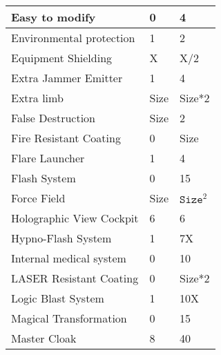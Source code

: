 \documentclass[twoside]{book}
\begin{document}
\begin{longtable}{p{1.25in}ll}
  \raggedright
           Easy to modify 
  &
   0 
  &
   4 
  \tabularnewline
  \hline
      
  \raggedright
           Environmental protection
           
  &
   1 
  &
   2 
  \tabularnewline
  \hline
      
  \raggedright
           Equipment Shielding 
  &
   X 
  &
   X/2 
  \tabularnewline
  \hline
      
  \raggedright
           Extra Jammer Emitter 
  &
   1 
  &
   4 
  \tabularnewline
  \hline
      
  \raggedright
           Extra limb 
  &
   Size 
  &
   Size*2 
  \tabularnewline
  \hline
      
  \raggedright
           False Destruction 
  &
   Size 
  &
   2 
  \tabularnewline
  \hline
      
  \raggedright
           Fire Resistant Coating 
  &
   0 
  &
   Size 
  \tabularnewline
  \hline
      
  \raggedright
           Flare Launcher 
  &
   1 
  &
   4 
  \tabularnewline
  \hline
      
  \raggedright
           Flash System 
  &
   0 
  &
   15 
  \tabularnewline
  \hline
      
  \raggedright
           Force Field 
  &
   Size 
  &
   \begin{math}{\texttt{Size}}^{2}\end{math} 
  \tabularnewline
  \hline
      
  \raggedright
           Holographic View Cockpit
           
  &
   6 
  &
   6 
  \tabularnewline
  \hline
      
  \raggedright
           Hypno-Flash System 
  &
   1 
  &
   7X 
  \tabularnewline
  \hline
      
  \raggedright
           Internal medical system
           
  &
   0 
  &
   10 
  \tabularnewline
  \hline
      
  \raggedright
           LASER Resistant Coating
           
  &
   0 
  &
   Size*2 
  \tabularnewline
  \hline
      
  \raggedright
           Logic Blast System 
  &
   1 
  &
   10X 
  \tabularnewline
  \hline
      
  \raggedright
           Magical Transformation 
  &
   0 
  &
   15 
  \tabularnewline
  \hline
      
  \raggedright
           Master Cloak 
  &
   8 
  &
   40 
  \tabularnewline
  \hline
      

\end{longtable}
\end{document}

